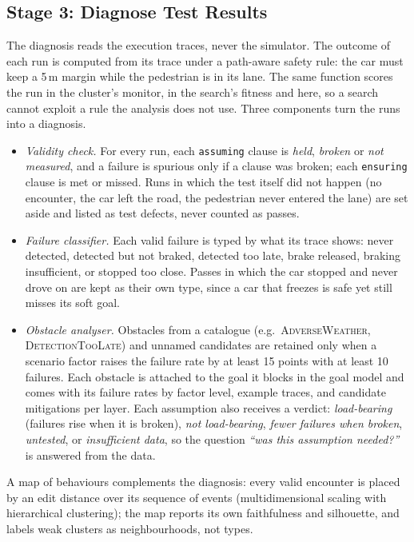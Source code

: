 \subsection{Stage 3: Diagnose Test Results}
\label{sec:diagnose}
The diagnosis reads the execution traces, never the simulator. The outcome
of each run is computed from its trace under a path-aware safety rule: the
car must keep a 5\,m margin while the pedestrian is in its lane. The same
function scores the run in the cluster's monitor, in the search's fitness
and here, so a search cannot exploit a rule the analysis does not use. Three
components turn the runs into a diagnosis.
\begin{itemize}
\item \emph{Validity check.} For every run, each \texttt{assuming} clause is
\emph{held}, \emph{broken} or \emph{not measured}, and a failure is spurious
only if a clause was broken; each \texttt{ensuring} clause is met or missed.
Runs in which the test itself did not happen (no encounter, the car left the
road, the pedestrian never entered the lane) are set aside and listed as test
defects, never counted as passes.
\item \emph{Failure classifier.} Each valid failure is typed by what its
trace shows: never detected, detected but not braked, detected too late,
brake released, braking insufficient, or stopped too close. Passes in which
the car stopped and never drove on are kept as their own type, since a car
that freezes is safe yet still misses its soft goal.
\item \emph{Obstacle analyser.} Obstacles from a catalogue (e.g.\
\textsc{AdverseWeather}, \textsc{DetectionTooLate}) and unnamed candidates
are retained only when a scenario factor raises the failure rate by at least
15 points with at least 10 failures. Each obstacle is attached to the goal it
blocks in the goal model and comes with its failure rates by factor level,
example traces, and candidate mitigations per layer. Each assumption also
receives a verdict: \emph{load-bearing} (failures rise when it is broken),
\emph{not load-bearing}, \emph{fewer failures when broken}, \emph{untested},
or \emph{insufficient data}, so the question \emph{``was this assumption
needed?''} is answered from the data.
\end{itemize}
A map of behaviours complements the diagnosis: every valid encounter is
placed by an edit distance over its sequence of events (multidimensional
scaling with hierarchical clustering); the map reports its own faithfulness
and silhouette, and labels weak clusters as neighbourhoods, not types.


